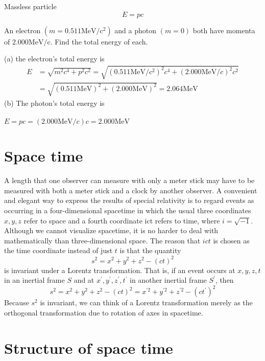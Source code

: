  Massless particle
 $$E=p c$$
 \begin{exercise}
 	An electron $\left(m=0.511 \mathrm{MeV} / \mathrm{c}^{2}\right)$ and a photon $(m=0)$ both have momenta of $2.000 \mathrm{MeV} / \mathrm{c}$. Find the total energy of each.
 \end{exercise}
\begin{answer}
 (a) the electron's total energy is\\
 \begin{align*}
 	E &=\sqrt{m^{2} c^{4}+p^{2} c^{2}}=\sqrt{\left(0.511 \mathrm{MeV} / c^{2}\right)^{2} c^{4}+(2.000 \mathrm{MeV} / c)^{2} c^{2}} \\
 	&=\sqrt{(0.511 \mathrm{MeV})^{2}+(2.000 \mathrm{MeV})^{2}}=2.064 \mathrm{MeV}
 \end{align*}
 (b) The photon's total energy is\\\\
 $E=p c=(2.000 \mathrm{MeV} / c) c=2.000 \mathrm{MeV}$	
\end{answer}
\section{Space time}
 A length that one observer can measure with only a meter stick may have to be measured with both a meter stick and a clock by another observer. A convenient and elegant way to express the results of special relativity is to regard events as occurring in a four-dimensional spacetime in which the usual three coordinates $x, y, z$ refer to space and a fourth coordinate ict refers to time, where $i=\sqrt{-1}$. Although we cannot visualize spacetime, it is no harder to deal with mathematically than three-dimensional space.
The reason that $i c t$ is chosen as the time coordinate instead of just $t$ is that the quantity
$$
s^{2}=x^{2}+y^{2}+z^{2}-(c t)^{2}
$$
is invariant under a Lorentz transformation. That is, if an event occurs at $x, y, z, t$ in an inertial frame $S$ and at $x^{\prime}, y^{\prime}, z^{\prime}, t^{\prime}$ in another inertial frame $S^{\prime}$, then
$$
s^{2}=x^{2}+y^{2}+z^{2}-(c t)^{2}=x^{\prime 2}+y^{\prime 2}+z^{\prime 2}-\left(c t^{\prime}\right)^{2}
$$
Because $s^{2}$ is invariant, we can think of a Lorentz transformation merely as the orthogonal transformation due to rotation of axes  in spacetime.
\section{Structure of space time}

